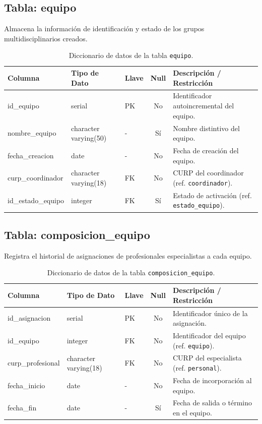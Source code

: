 \subsection{Tabla: equipo}
Almacena la información de identificación y estado de los grupos multidisciplinarios creados.
\begin{table}[htbp!]
\centering
\begin{tabular}{|l|l|l|c|l|}
\hline
\textbf{Columna} & \textbf{Tipo de Dato} & \textbf{Llave} & \textbf{Null} & \textbf{Descripción / Restricción} \\
\hline
id\_equipo & serial & PK & No & Identificador autoincremental del equipo. \\
nombre\_equipo & character varying(50) & - & Sí & Nombre distintivo del equipo. \\
fecha\_creacion & date & - & No & Fecha de creación del equipo. \\
curp\_coordinador & character varying(18) & FK & No & CURP del coordinador (ref. \texttt{coordinador}). \\
id\_estado\_equipo & integer & FK & Sí & Estado de activación (ref. \texttt{estado\_equipo}). \\
\hline
\end{tabular}
\caption{Diccionario de datos de la tabla \texttt{equipo}.}
\label{tbl:diccionarioEquipo}
\end{table}

\subsection{Tabla: composicion\_equipo}
Registra el historial de asignaciones de profesionales especialistas a cada equipo.
\begin{table}[htbp!]
\centering
\begin{tabular}{|l|l|l|c|l|}
\hline
\textbf{Columna} & \textbf{Tipo de Dato} & \textbf{Llave} & \textbf{Null} & \textbf{Descripción / Restricción} \\
\hline
id\_asignacion & serial & PK & No & Identificador único de la asignación. \\
id\_equipo & integer & FK & No & Identificador del equipo (ref. \texttt{equipo}). \\
curp\_profesional & character varying(18) & FK & No & CURP del especialista (ref. \texttt{personal}). \\
fecha\_inicio & date & - & No & Fecha de incorporación al equipo. \\
fecha\_fin & date & - & Sí & Fecha de salida o término en el equipo. \\
\hline
\end{tabular}
\caption{Diccionario de datos de la tabla \texttt{composicion\_equipo}.}
\label{tbl:diccionarioComposicion}
\end{table}

